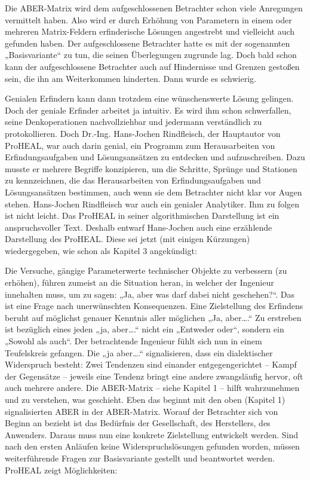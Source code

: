 \documentclass[12pt,a4paper]{article}
\begin{document}
Die ABER-Matrix wird dem aufgeschlossenen Betrachter schon viele Anregungen
vermittelt haben. Also wird er durch Erhöhung von Parametern in einem oder
mehreren Matrix-Feldern erfinderische Lösungen angestrebt und vielleicht auch
gefunden haben. Der aufgeschlossene Betrachter hatte es mit der sogenannten
„Basisvariante“ zu tun, die seinen Überlegungen zugrunde lag. Doch bald schon
kann der aufgeschlossene Betrachter auch auf Hindernisse und Grenzen gestoßen
sein, die ihn am Weiterkommen hinderten. Dann wurde es schwierig.

Genialen Erfindern kann dann trotzdem eine wünschenswerte Lösung gelingen. Doch
der geniale Erfinder arbeitet ja intuitiv. Es wird ihm schon schwerfallen,
seine Denkoperationen nachvollziehbar und jedermann verständlich zu
protokollieren.  Doch Dr.-Ing. Hans-Jochen Rindfleisch, der Hauptautor von
ProHEAL, war auch darin genial, ein Programm zum Herausarbeiten von
Erfindungsaufgaben und Lösungsansätzen zu entdecken und aufzuschreiben. Dazu
musste er mehrere Begriffe konzipieren, um die Schritte, Sprünge und Stationen
zu kennzeichnen, die das Herausarbeiten von Erfindungsaufgaben und
Lösungsansätzen bestimmen, auch wenn sie dem Betrachter nicht klar vor Augen
stehen. Hans-Jochen Rindfleisch war auch ein genialer Analytiker. Ihm zu folgen
ist nicht leicht. Das ProHEAL in seiner algorithmischen Darstellung ist ein
anspruchsvoller Text. Deshalb entwarf Hans-Jochen auch eine erzählende
Darstellung des ProHEAL. Diese sei jetzt (mit einigen Kürzungen) wiedergegeben,
wie schon als Kapitel 3 angekündigt:

Die Versuche, gängige Parameterwerte technischer Objekte zu verbessern (zu
erhöhen), führen zumeist an die Situation heran, in welcher der Ingenieur
innehalten muss, um zu sagen: „Ja, aber was darf dabei nicht geschehen?“. Das
ist eine Frage nach unerwünschten Konsequenzen. Eine Zielstellung des Erfindens
beruht auf möglichst genauer Kenntnis aller möglichen „Ja, aber….“ Zu erstreben
ist bezüglich eines jeden „ja, aber….“ nicht ein „Entweder oder“, sondern ein
„Sowohl als auch“. Der betrachtende Ingenieur fühlt sich nun in einem
Teufelskreis gefangen. Die „ja aber….“ signalisieren, dass ein dialektischer
Widerspruch besteht: Zwei Tendenzen sind einander entgegengerichtet – Kampf der
Gegensätze – jeweils eine Tendenz bringt eine andere zwangsläufig hervor, oft
auch mehrere andere. Die ABER-Matrix – siehe Kapitel 1 -- hilft wahrzunehmen
und zu verstehen, was geschieht. Eben das beginnt mit den oben (Kapitel 1)
signalisierten ABER in der ABER-Matrix. Worauf der Betrachter sich von Beginn
an bezieht ist das Bedürfnis der Gesellschaft, des Herstellers, des Anwenders.
Daraus muss nun eine konkrete Zielstellung entwickelt werden. Sind nach den
ersten Anläufen keine Widerspruchslösungen gefunden worden, müssen
weiterführende Fragen zur Basisvariante gestellt und beantwortet werden.
ProHEAL zeigt Möglichkeiten:
\end{document}
